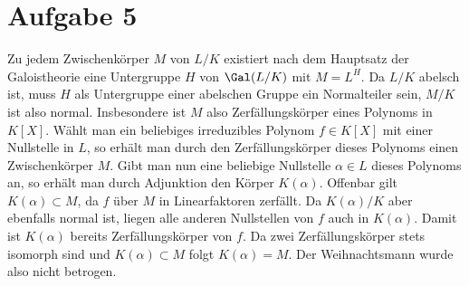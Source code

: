 \documentclass{article}
\begin{document}
    \section*{Aufgabe 5}
    Zu jedem Zwischenkörper $M$ von $L/K$ existiert nach dem Hauptsatz der Galoistheorie eine Untergruppe $H$ von $\Gal(L/K)$ mit $M = L^H$.
    Da $L/K$ abelsch ist, muss $H$ als Untergruppe einer abelschen Gruppe ein Normalteiler sein, $M/K$ ist also normal.
    Insbesondere ist $M$ also Zerfällungskörper eines Polynoms in $K[X]$. Wählt man ein beliebiges irreduzibles Polynom $f \in K[X]$ mit einer Nullstelle in $L$, so erhält man durch den Zerfällungskörper dieses Polynoms einen Zwischenkörper $M$. 
    Gibt man nun eine beliebige Nullstelle $\alpha \in L$ dieses Polynoms an, so erhält man durch Adjunktion den Körper $K(\alpha)$. Offenbar gilt $K(\alpha) \subset M$, da $f$ über $M$ in Linearfaktoren zerfällt. Da $K(\alpha)/K$ aber ebenfalls normal ist, liegen alle anderen Nullstellen von $f$ auch in $K(\alpha)$. Damit ist $K(\alpha)$ bereits Zerfällungskörper von $f$. Da zwei Zerfällungskörper stets isomorph sind und $K(\alpha) \subset M$ folgt $K(\alpha) = M$.
    Der Weihnachtsmann wurde also nicht betrogen.
\end{document}
